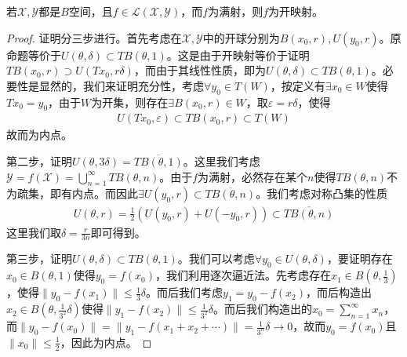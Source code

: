 	\begin{theorem}[开映射定理]
		若$\mathscr{X},\mathscr{Y}$都是$B$空间，且$f\in\mathscr{L}(\mathscr{X},\mathscr{Y})$，而$f$为满射，则$f$为开映射。
	\end{theorem}
	\begin{proof}
		证明分三步进行。首先考虑在$\mathscr{X},\mathscr{Y}$中的开球分别为$B(x_0,r),U(y_0,r)$。原命题等价于$U(\theta,\delta)\subset TB(\theta,1)$。这是由于开映射等价于证明$TB(x_0,r)\supset U(Tx_0,r\delta)$，而由于其线性性质，即为$U(\theta,\delta)\subset TB(\theta,1)$。必要性是显然的，我们来证明充分性，考虑$\forall y_0\in T(W)$，按定义有$\exists x_0\in W$使得$Tx_0 = y_0$，由于$W$为开集，则存在$\exists B(x_0,r)\in W$，取$\varepsilon = r\delta$，使得
		\begin{align*}
			U(Tx_0, \varepsilon) \subset TB(x_0, r) \subset T(W)
		\end{align*}
		故而为内点。
		
		第二步，证明$U(\theta,3\delta) = \overline{TB(\theta,1)}$。这里我们考虑$\mathscr{Y} = f(\mathscr{X}) = \bigcup\limits_{n=1}^{\infty} TB(\theta, n)$。由于$f$为满射，必然存在某个$n$使得$TB(\theta, n)$不为疏集，即有内点。而因此$\exists U(y_0,r)\subset \overline{TB(\theta, n)}$。我们考虑对称凸集的性质
		\begin{align*}
			U(\theta,r) = \frac{1}{2}(U(y_0, r) + U(-y_0,r)) \subset \overline{TB(\theta, n)}
		\end{align*}
		这里我们取$\delta = \frac{r}{3n}$即可得到。
		
		第三步，证明$U(\theta,\delta)\subset TB(\theta,1)$。我们可以考虑$\forall y_0\in U(\theta,\delta)$，要证明存在$x_0\in B(\theta,1)$使得$y_0 = f(x_0)$，我们利用逐次逼近法。先考虑存在$x_1\in B(\theta, \frac{1}{3})$，使得$\| y_0 - f(x_1)\| \leqslant \frac{1}{3}\delta$。而后我们考虑$y_1 = y_0 - f(x_2)$，而后构造出$x_2\in B(\theta,\frac{1}{3^2}\delta)$使得$\| y_1 - f(x_2)\| \leqslant \frac{1}{3^2}\delta$。而后我们构造出的$x_0 = \sum\limits_{n=1}^{\infty} x_n$，而$\|y_0 - f(x_0)\| = \|y_1 - f(x_1+x_2+\cdots)\| = \frac{1}{3^n}\delta\to 0$，故而$y_0 = f(x_0)$且$\|x_0\| \leqslant \frac{1}{2}$，因此为内点。
	\end{proof}
	
